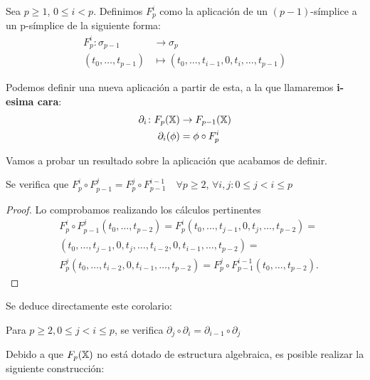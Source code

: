 \begin{definition}
  Sea $p \geq 1$, $0 \leq i < p$. Definimos $F_p^i$ como la aplicación de un $(p-1)$-símplice a un p-símplice de la siguiente forma:
  \begin{align*}
    F_p^i \colon \sigma_{p-1} &\to \sigma_p\\
    (t_0, \dots, t_{p-1}) &\mapsto (t_0, \dots, t_{i-1}, 0, t_i, \dots, t_{p-1})
  \end{align*}

  Podemos definir una nueva aplicación a partir de esta, a la que llamaremos \textbf{i-esima cara}:
  \begin{align*}
    \partial_i \colon F_{p}({\mathbb X}) &\to F_{p-1}({\mathbb X})\\
    \partial_i(\phi) &= \phi \circ F_p^i
  \end{align*}
\end{definition}

Vamos a probar un resultado sobre la aplicación que acabamos de definir.

\begin{lemma}
  Se verifica que $F_p^i \circ F_{p-1}^j = F_p^j \circ F_{p-1}^{i-1} \quad \forall p \geq 2$, $\forall i, j \colon 0 \leq j < i \leq p$
\end{lemma}

\begin{proof}
Lo comprobamos realizando los cálculos pertinentes
  \begin{align*}
    &F_p^i \circ F_{p-1}^j (t_0, \dots, t_{p-2}) = F_p^i (t_0, \dots, t_{j-1}, 0, t_j, \dots, t_{p-2}) = \\
    &(t_0, \dots, t_{j-1}, 0, t_j, \dots, t_{i-2}, 0, t_{i-1}, \dots, t_{p-2}) = \\
    &F_p^j (t_0, \dots, t_{i-2}, 0, t_{i-1}, \dots, t_{p-2}) = F_p^j \circ F_{p-1}^{i-1} (t_0, \dots, t_{p-2}).
  \end{align*}
\end{proof}

Se deduce directamente este corolario:

\begin{corollary}
  Para $p \geq 2, 0 \leq j < i \leq p$, se verifica $\partial_j \circ \partial_i = \partial_{i-1} \circ \partial_j$
\end{corollary}

Debido a que $F_{p}({\mathbb X})$ no está dotado de estructura algebraica, es posible realizar la siguiente construcción:

